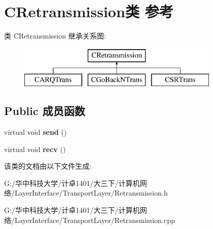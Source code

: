 \hypertarget{class_c_retransmission}{}\section{C\+Retransmission类 参考}
\label{class_c_retransmission}
类 C\+Retransmission 继承关系图\+:\begin{figure}[H]
\begin{center}
\leavevmode
\includegraphics[height=2.000000cm]{class_c_retransmission}
\end{center}
\end{figure}
\subsection*{Public 成员函数}
\begin{DoxyCompactItemize}
\item 
\mbox{\label{class_c_retransmission_a2a97991aa1bd05adf369d0a1b38b2a10}} 
virtual void {\bfseries send} ()
\item 
\mbox{\label{class_c_retransmission_afd36095dafeb4a237e0b6f7c68bb989b}} 
virtual void {\bfseries recv} ()
\end{DoxyCompactItemize}


该类的文档由以下文件生成\+:\begin{DoxyCompactItemize}
\item 
G\+:/华中科技大学/计卓1401/大三下/计算机网络/\+Layer\+Interface/\+Transport\+Layer/Retransmission.\+h\item 
G\+:/华中科技大学/计卓1401/大三下/计算机网络/\+Layer\+Interface/\+Transport\+Layer/Retransmission.\+cpp\end{DoxyCompactItemize}
